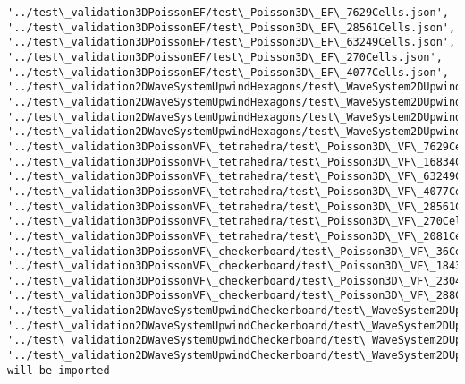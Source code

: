 \documentclass[11pt]{article}
\begin{document}
\begin{Verbatim}[commandchars=\\\{\}]
'../test\_validation3DPoissonEF/test\_Poisson3D\_EF\_7629Cells.json', '../test\_validation3DPoissonEF/test\_Poisson3D\_EF\_28561Cells.json', '../test\_validation3DPoissonEF/test\_Poisson3D\_EF\_63249Cells.json', '../test\_validation3DPoissonEF/test\_Poisson3D\_EF\_270Cells.json', '../test\_validation3DPoissonEF/test\_Poisson3D\_EF\_4077Cells.json', '../test\_validation2DWaveSystemUpwindHexagons/test\_WaveSystem2DUpwind\_squareWithHexagons255Cells.json', '../test\_validation2DWaveSystemUpwindHexagons/test\_WaveSystem2DUpwind\_squareWithHexagons25Cells.json', '../test\_validation2DWaveSystemUpwindHexagons/test\_WaveSystem2DUpwind\_squareWithHexagons1020Cells.json', '../test\_validation2DWaveSystemUpwindHexagons/test\_WaveSystem2DUpwind\_squareWithHexagons2850Cells.json', '../test\_validation3DPoissonVF\_tetrahedra/test\_Poisson3D\_VF\_7629Cells.json', '../test\_validation3DPoissonVF\_tetrahedra/test\_Poisson3D\_VF\_16834Cells.json', '../test\_validation3DPoissonVF\_tetrahedra/test\_Poisson3D\_VF\_63249Cells.json', '../test\_validation3DPoissonVF\_tetrahedra/test\_Poisson3D\_VF\_4077Cells.json', '../test\_validation3DPoissonVF\_tetrahedra/test\_Poisson3D\_VF\_28561Cells.json', '../test\_validation3DPoissonVF\_tetrahedra/test\_Poisson3D\_VF\_270Cells.json', '../test\_validation3DPoissonVF\_tetrahedra/test\_Poisson3D\_VF\_2081Cells.json', '../test\_validation3DPoissonVF\_checkerboard/test\_Poisson3D\_VF\_36Cells.json', '../test\_validation3DPoissonVF\_checkerboard/test\_Poisson3D\_VF\_18432Cells.json', '../test\_validation3DPoissonVF\_checkerboard/test\_Poisson3D\_VF\_2304Cells.json', '../test\_validation3DPoissonVF\_checkerboard/test\_Poisson3D\_VF\_288Cells.json', '../test\_validation2DWaveSystemUpwindCheckerboard/test\_WaveSystem2DUpwind\_squareWithCheckerboard40Cells.json', '../test\_validation2DWaveSystemUpwindCheckerboard/test\_WaveSystem2DUpwind\_squareWithCheckerboard2560Cells.json', '../test\_validation2DWaveSystemUpwindCheckerboard/test\_WaveSystem2DUpwind\_squareWithCheckerboard160Cells.json', '../test\_validation2DWaveSystemUpwindCheckerboard/test\_WaveSystem2DUpwind\_squareWithCheckerboard640Cells.json']
will be imported

    \end{Verbatim}
\end{document}
